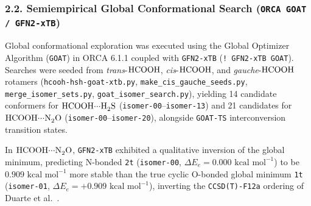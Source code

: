 \documentclass[journal=jpclcd,manuscript=article]{achemso}
\begin{document}
\subsubsection{2.2. Semiempirical Global Conformational Search (\texttt{ORCA GOAT / GFN2-xTB})}
Global conformational exploration was executed using the Global Optimizer Algorithm (\texttt{GOAT}) \cite{deSouza2025} in ORCA 6.1.1 \cite{Neese2020, Neese2022} coupled with \texttt{GFN2-xTB} \cite{Bannwarth2019} (\texttt{! GFN2-xTB GOAT}). Searches were seeded from \textit{trans}-$\ce{HCOOH}$, \textit{cis}-$\ce{HCOOH}$, and \textit{gauche}-$\ce{HCOOH}$ rotamers (\texttt{hcooh-hsh-goat-xtb.py}, \texttt{make\_cis\_gauche\_seeds.py}, \texttt{merge\_isomer\_sets.py}, \texttt{goat\_isomer\_search.py}), yielding 14 candidate conformers for $\ce{HCOOH\bond{...}H2S}$ (\texttt{isomer-00}--\texttt{isomer-13}) and 21 candidates for $\ce{HCOOH\bond{...}N2O}$ (\texttt{isomer-00}--\texttt{isomer-20}), alongside \texttt{GOAT-TS} interconversion transition states.

In $\ce{HCOOH\bond{...}N2O}$, \texttt{GFN2-xTB} exhibited a qualitative inversion of the global minimum, predicting N-bonded \texttt{2t} (\texttt{isomer-00}, $\Delta E_e = 0.000\text{ kcal mol}^{-1}$) to be $0.909\text{ kcal mol}^{-1}$ more stable than the true cyclic O-bonded global minimum \texttt{1t} (\texttt{isomer-01}, $\Delta E_e = +0.909\text{ kcal mol}^{-1}$), inverting the \texttt{CCSD(T)-F12a} ordering of Duarte et al.\ \cite{Duarte2017}.
\end{document}
